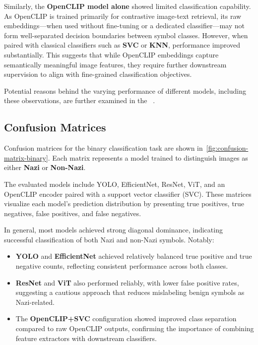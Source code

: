 Similarly, the \textbf{OpenCLIP model alone} showed limited classification capability. As OpenCLIP is trained
primarily for contrastive image-text retrieval, its raw embeddings—when used without fine-tuning or a dedicated
classifier—may not form well-separated decision boundaries between symbol classes. However, when paired with
classical classifiers such as \textbf{SVC} or \textbf{KNN}, performance improved substantially. This suggests that
while OpenCLIP embeddings capture semantically meaningful image features, they require further downstream
supervision to align with fine-grained classification objectives.

Potential reasons behind the varying performance of different models, including these observations, are further
examined in the ~.





\newpage

\subsection{Confusion Matrices}

Confusion matrices for the binary classification task are shown in~\autoref{fig:confusion-matrix-binary}. Each
matrix represents a model trained to distinguish images as either \textbf{Nazi} or \textbf{Non-Nazi}.

The evaluated models include \ac{YOLO}, EfficientNet, \ac{ResNet}, \ac{ViT}, and an OpenCLIP encoder paired with a
support vector classifier (SVC). These matrices visualize each model's prediction distribution by presenting true
positives, true negatives, false positives, and false negatives.

In general, most models achieved strong diagonal dominance, indicating successful classification of both Nazi and
non-Nazi symbols. Notably:

\begin{itemize}
\item \textbf{YOLO} and \textbf{EfficientNet} achieved relatively balanced true positive and true negative counts,
reflecting consistent performance across both classes.
\item \textbf{ResNet} and \textbf{ViT} also performed reliably, with lower false positive rates, suggesting a
cautious approach that reduces mislabeling benign symbols as Nazi-related.
\item The \textbf{OpenCLIP+SVC} configuration showed improved class separation compared to raw OpenCLIP outputs,
confirming the importance of combining feature extractors with downstream classifiers.
\end{itemize}

